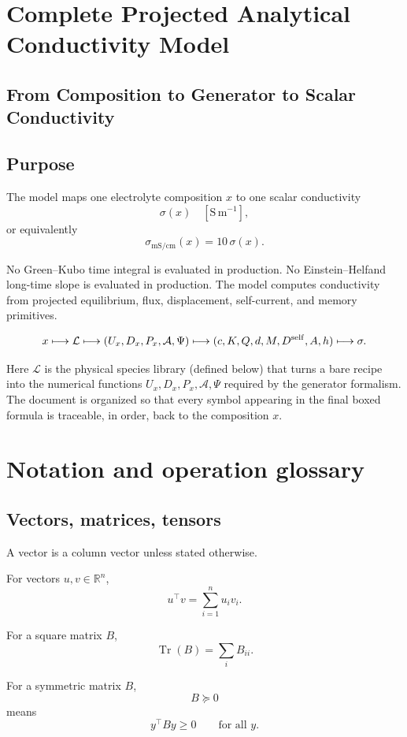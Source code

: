 \documentclass[11pt]{article}
\newcommand{\R}{\mathbb R}
\newcommand{\Tr}{\operatorname{Tr}}
\begin{document}
\section*{Complete Projected Analytical Conductivity Model}
\subsection*{From Composition to Generator to Scalar Conductivity}

\subsection*{Purpose}

The model maps one electrolyte composition \(x\) to one scalar conductivity
\[
\sigma(x)\quad [\mathrm{S\,m^{-1}}],
\]
or equivalently
\[
\sigma_{\mathrm{mS/cm}}(x)=10\,\sigma(x).
\]

No Green--Kubo time integral is evaluated in production.
No Einstein--Helfand long-time slope is evaluated in production.
The model computes conductivity from projected equilibrium, flux, displacement,
self-current, and memory primitives.

\[
x
\longmapsto
\mathcal L
\longmapsto
(U_x,D_x,P_x,\mathcal A,\Psi)
\longmapsto
(c,K,Q,d,M,D^{\rm self},A,h)
\longmapsto
\sigma.
\]

Here \(\mathcal L\) is the physical species library (defined below) that turns
a bare recipe into the numerical functions \(U_x,D_x,P_x,\mathcal A,\Psi\)
required by the generator formalism. The document is organized so that every
symbol appearing in the final boxed formula is traceable, in order, back to
the composition \(x\).

\section{Notation and operation glossary}

\subsection{Vectors, matrices, tensors}

A vector is a column vector unless stated otherwise.

For vectors \(u,v\in\R^n\),
\[
u^\top v=\sum_{i=1}^n u_i v_i.
\]

For a square matrix \(B\),
\[
\Tr(B)=\sum_i B_{ii}.
\]

For a symmetric matrix \(B\),
\[
B\succeq0
\]
means
\[
y^\top B y\ge0
\qquad
\text{for all }y.
\]
\end{document}
